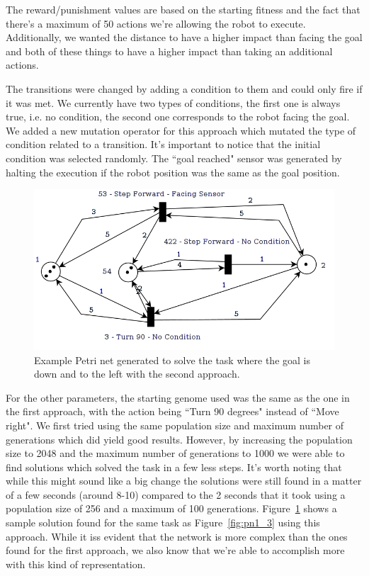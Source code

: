 \documentclass[12pt,a4paper,twocolumn]{article}
\begin{document}
The reward/punishment values are based on the starting fitness and the fact that there's a maximum of 50 actions we're allowing the robot to execute. Additionally, we wanted the distance to have a higher impact than facing the goal and both of these things to have a higher impact than taking an additional actions. 

The transitions were changed by adding a condition to them and could only fire if it was met. We currently have two types of conditions, the first one is always true, i.e. no condition, the second one corresponds to the robot facing the goal. We added a new mutation operator for this approach which mutated the type of condition related to a transition. It's important to notice that the initial condition was selected randomly. The ``goal reached" sensor was generated by halting the execution if the robot position was the same as the goal position. 

\begin{figure}
\centering
\includegraphics[scale=0.3, trim = 0 5mm 0 0, clip = true] {PetriNet_3_1}
\caption{Example Petri net generated to solve the task where the goal is down and to the left with the second approach.}
\label{fig:pn2_1}
\end{figure}

For the other parameters, the starting genome used was the same as the one in the first approach, with the action being ``Turn 90 degrees" instead of ``Move right". We first tried using the same population size and maximum number of generations which did yield good results. However, by increasing the population size to 2048 and the maximum number of generations to 1000 we were able to find solutions which solved the task in a few less steps. It's worth noting that while this might sound like a big change the solutions were still found in a matter of a few seconds (around 8-10) compared to the 2 seconds that it took using a population size of 256 and a maximum of 100 generations. Figure~\ref{fig:pn2_1} shows a sample solution found for the same task as Figure~\ref{fig:pn1_3} using this approach. While it iss evident that the network is more complex than the ones found for the first approach, we also know that we're able to accomplish more with this kind of representation.
\end{document}
